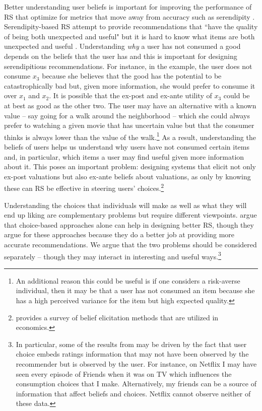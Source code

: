 \documentclass[sigconf]{acmart}
\begin{document}
\par
Better understanding user beliefs is important for improving the performance of RS that optimize for metrics that move away from accuracy such as serendipity \cite{kotkov2016survey}. Serendipity-based RS attempt to provide recommendations that ``have the quality of being both unexpected and useful" \cite{maksai2015predicting} but it is hard to know what items are both unexpected and useful \cite{kotkov2016survey}. Understanding \textit{why} a user has not consumed a good depends on the beliefs that the user has and this is important for designing serendipitious recommendations. For instance, in the example, the user does not consume $x_3$ because she believes that the good has the potential to be catastrophically bad but, given more information, she would prefer to consume it over $x_1$ and $x_2$. It is possible that the ex-post and ex-ante utility of $x_3$ could be at best as good as the other two. The user may have an alternative with a known value -- say going for a walk around the neighborhood -- which she could always prefer to watching a given movie that has uncertain value but that the consumer thinks is always lower than the value of the walk.\footnote{An additional reason this could be useful is if one considers a risk-averse individual, then it may be that a user has not consumed an item because she has a high perceived variance for the item but high expected quality.}
As a result, understanding the beliefs of users helps us understand why users have not consumed certain items and, in particular, which items a user may find useful given more information about it. This poses an important problem: designing systems that elicit not only ex-post valuations but also ex-ante beliefs about valuations, as only by knowing these can RS be effective in steering users' choices.\footnote{\cite{schotter2014belief} provides a survey of belief elicitation methods that are utilized in economics.}
\par
Understanding the choices that individuals will make as well as what they will end up liking are complementary problems but require different viewpoints. \cite{jiang2014choice, saavedra2016choice} argue that choice-based approaches alone can help in designing better RS, though they argue for these approaches because they do a better job at providing more accurate recommendations. We argue that the two problems should be considered separately -- though they may interact in interesting and useful ways.\footnote{In particular, some of the results from \cite{jiang2014choice, saavedra2016choice} may be driven by the fact that user choice embeds ratings information that may not have been observed by the recommender but is observed by the user. For instance, on Netflix I may have seen every episode of Friends when it was on TV which influences the consumption choices that I make. Alternatively, my friends can be a source of information that affect beliefs and choices. Netflix cannot observe neither of these data.} 
\end{document}

